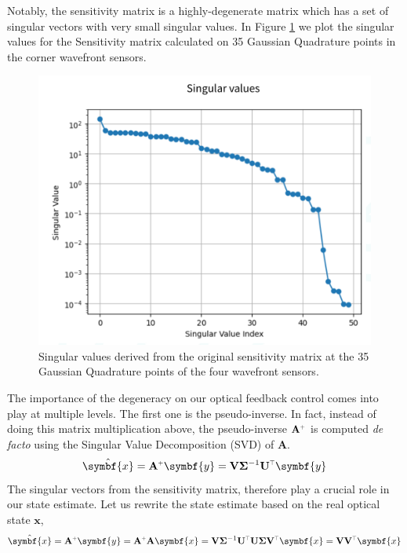 \documentclass[SE,authoryear,toc]{lsstdoc}
\renewcommand{\v}[1]{\mathbf{#1}}
\newcommand{\plus}{\scalebox{0.6}{$+$}}
\newcommand{\tr}{\scalebox{0.6}{$\top$}}
\begin{document}
Notably, the sensitivity matrix is a highly-degenerate matrix which has a set of singular vectors with very small singular values. In Figure \ref{fig1} we plot the singular values for the Sensitivity matrix calculated on 35 Gaussian Quadrature points in the corner wavefront sensors. 

\begin{figure}[h!]
    \centering
    \includegraphics[scale = 0.5]{figures/singular_values.png}
    \caption{Singular values derived from the original sensitivity matrix at the 35 Gaussian Quadrature points of the four wavefront sensors.}
    \label{fig1}
\end{figure}

The importance of the degeneracy on our optical feedback control comes into play at multiple levels. The first one is the pseudo-inverse. In fact, instead of doing this matrix multiplication above, the pseudo-inverse $\v{A}^{\plus}$ is computed \textit{de facto} using the Singular Value Decomposition (SVD) of $\v{A}$.
\begin{equation}
     \hat{\symbf{x}} = \v{A}^{\plus}\symbf{y} = \v{V} \v{\Sigma}^{-1} \v{U^{\tr}}\symbf{y}
\end{equation}
The singular vectors from the sensitivity matrix, therefore play a crucial role in our state estimate. Let us rewrite the state estimate based on the real optical state $\symbf{x}$,
\begin{equation}
     \hat{\symbf{x}} = \v{A}^{\plus}\symbf{y} = \v{A}^{\plus}\v{A}\symbf{x} = \v{V}\v{\Sigma}^{-1} \v{U^{\tr}}\v{U} \v{\Sigma} \v{V^{\tr}}\symbf{x} =  \v{V}\v{V^{\tr}}\symbf{x}
\end{equation}
\end{document}
